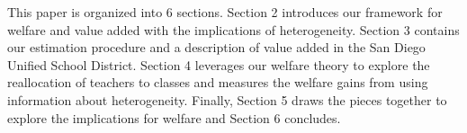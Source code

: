 \documentclass[12pt]{article}
\theoremstyle{definition}
\theoremstyle{definition}
\theoremstyle{definition}
\theoremstyle{definition}
\begin{document}














This paper is organized into 6 sections. Section 2 introduces our framework for welfare and value added with the implications of heterogeneity. Section 3 contains our estimation procedure and a description of value added in the San Diego Unified School District. Section 4 leverages our welfare theory to explore the reallocation of teachers to classes and measures the welfare gains from using information about heterogeneity. Finally, Section 5 draws the pieces together to explore the implications for welfare and Section 6 concludes.




\end{document}
